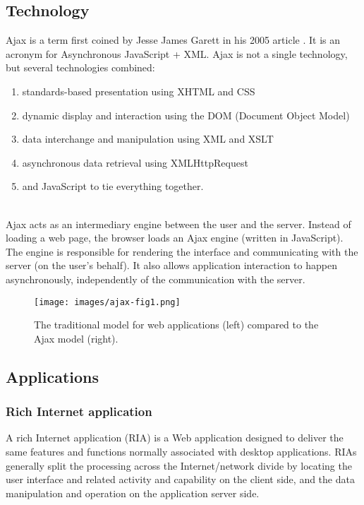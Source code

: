 \subsection{Technology}
Ajax is a term first coined by Jesse James Garett in his 2005 article \cite{garrett2005ajax}. It is an acronym for Asynchronous JavaScript + XML. Ajax is not a single technology, but several technologies combined:\\
\begin{enumerate}
	\item standards-based presentation using XHTML and CSS
	\item dynamic display and interaction using the DOM (Document Object Model)
	\item data interchange and manipulation using XML and XSLT
	\item asynchronous data retrieval using XMLHttpRequest
	\item and JavaScript to tie everything together.
\end{enumerate} 
~\\
Ajax acts as an intermediary engine between the user and the server. Instead of loading a web page, the browser loads an Ajax engine (written in JavaScript). The engine is responsible for rendering the interface and communicating with the server (on the user's behalf). It also allows application interaction to happen asynchronously, independently of the communication with the server.\\

\begin{figure}[h]
	\centering
	\texttt{[image: images/ajax-fig1.png]}
	\caption{The traditional model for web applications (left) compared to the Ajax model (right).}
\end{figure}	

\subsection{Applications}

\subsubsection{Rich Internet application}
A rich Internet application (RIA) is a Web application designed to deliver the same features and functions normally associated with desktop applications. RIAs generally split the processing across the Internet/network divide by locating the user interface and related activity and capability on the client side, and the data manipulation and operation on the application server side. \\
 
